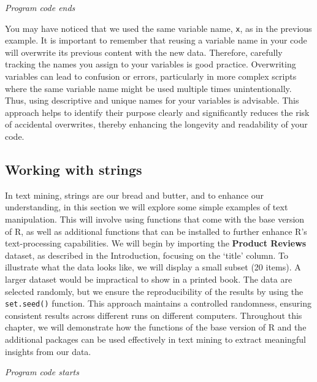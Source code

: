 \emph{Program code ends}

You may have noticed that we used the same variable name, \texttt{x}, as
in the previous example. It is important to remember that reusing a
variable name in your code will overwrite its previous content with the
new data. Therefore, carefully tracking the names you assign to your
variables is good practice. Overwriting variables can lead to
confusion or errors, particularly in more complex scripts where the same
variable name might be used multiple times unintentionally. Thus, using
descriptive and unique names for your variables is advisable. This
approach helps to identify their purpose clearly and significantly
reduces the risk of accidental overwrites, thereby enhancing the
longevity and readability of your code.

\subsection{Working with strings}

In text mining, strings are our bread and butter, and to enhance our
understanding, in this section we will explore some simple examples of text
manipulation. This will involve using functions that
come with the base version of R, as well as additional functions that
can be installed to further enhance R's text-processing capabilities. We
will begin by importing the \textbf{Product Reviews} dataset, as
described in the Introduction, focusing on the `title' column.
To illustrate what the data looks like, we will display a small subset
(20 items). A larger dataset would be impractical to show in a printed
book. The data are selected randomly, but we ensure the reproducibility of
the results by using the \texttt{set.seed()} function. This approach
maintains a controlled randomness, ensuring consistent results across
different runs on different computers. Throughout this chapter, we will
demonstrate how the functions of the base version of R and the additional packages can
be used effectively in text mining to extract meaningful insights from our data.

\emph{Program code starts}

